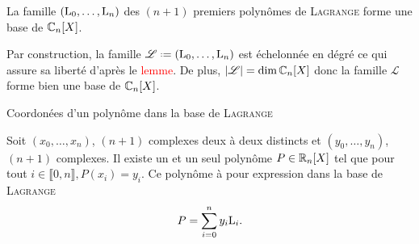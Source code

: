 \begin{prop}
    La famille $(\mathrm{L}_0, \dots, \mathrm{L}_n)$ des $(n+1)$ premiers polynômes de \textsc{Lagrange} forme une base de $\mathbb{C}_n[X]$.
\end{prop}

\begin{preuve} 
    Par construction, la famille $\mathscr{L} \defeq (\Lag_0, \dots, \Lag_n)$ est échelonnée en dégré ce qui assure sa liberté d'après le \textcolor{red}{lemme}. De plus, $|\mathscr{L}| = \dim \mathbb{C}_n[X]$ donc la famille $\mathscr{L}$ forme bien une base de $\mathbb{C}_n[X]$.
\end{preuve}

Coordonées d'un polynôme dans la base de \textsc{Lagrange}

\begin{prop}

Soit $(x_0, \dots, x_n)$, $(n+1)$ complexes deux à deux distincts et $(y_0, \dots, y_n)$, $(n+1)$ complexes. Il existe un et un seul polynôme $P \in \mathbb{R}_n[X]$ tel que pour tout $i \in \llbracket 0, n \rrbracket, P(x_i) = y_i$. Ce polynôme à pour expression dans la base de \textsc{Lagrange}
$$P = \sum_{i=0}^n y_i \mathrm{L}_i.$$
\end{prop}

\begin{marginfigure}[-5cm]
    
\end{marginfigure}
